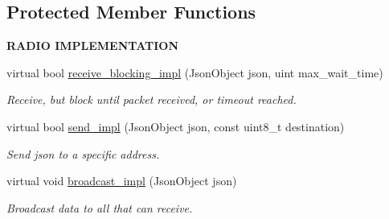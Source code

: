 \subsection*{Protected Member Functions}
\begin{Indent}{\bf R\+A\+D\+IO I\+M\+P\+L\+E\+M\+E\+N\+T\+A\+T\+I\+ON}\par
\begin{DoxyCompactItemize}
\item 
virtual bool \hyperlink{class_loom_comm_plat_acc447dd60751ea7536f0c96b4390fdd8}{receive\+\_\+blocking\+\_\+impl} (Json\+Object json, uint max\+\_\+wait\+\_\+time)
\begin{DoxyCompactList}\small\item\em Receive, but block until packet received, or timeout reached. \end{DoxyCompactList}\item 
virtual bool \hyperlink{class_loom_comm_plat_a28f40393c7d50d3bf30eff3add02d6fc}{send\+\_\+impl} (Json\+Object json, const uint8\+\_\+t destination)
\begin{DoxyCompactList}\small\item\em Send json to a specific address. \end{DoxyCompactList}\item 
virtual void \hyperlink{class_loom_comm_plat_ae88689d0db8ab91d1e672f0b5c358945}{broadcast\+\_\+impl} (Json\+Object json)
\begin{DoxyCompactList}\small\item\em Broadcast data to all that can receive. \end{DoxyCompactList}\end{DoxyCompactItemize}
\end{Indent}
